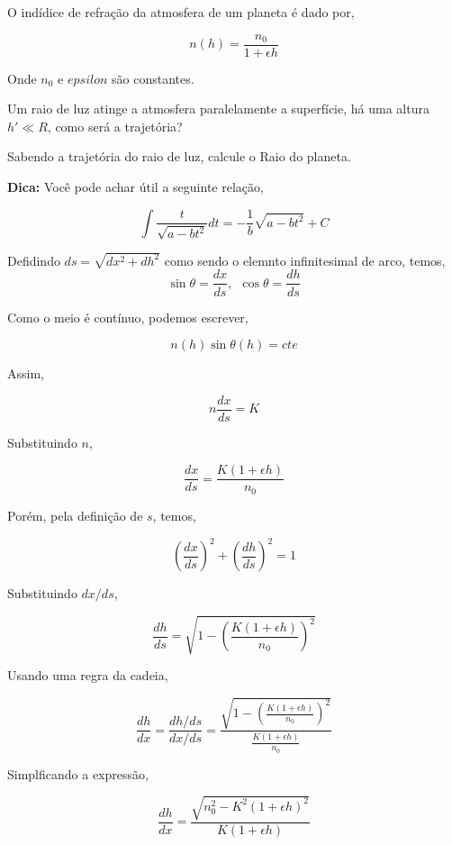 \documentclass[11pt]{article}
\begin{document}
\begin{pproblem}
    O indídice de refração da atmosfera de um planeta é dado por, 

    \[n(h) = \frac{n_0}{1+\epsilon h}\]

    Onde \(n_0\) e \(epsilon\) são constantes.

    \begin{alternativas}
        \item Um raio de luz atinge a atmosfera paralelamente a superfície, há uma altura \(h'\ll R\), como será a trajetória?
        \item Sabendo a trajetória do raio de luz, calcule o Raio do planeta.
    
        \textbf{Dica:} Você pode achar útil a seguinte relação, 

        \[\int \frac{t}{\sqrt{a-bt^2}}dt = -\frac{1}{b}\sqrt{a-bt^2}+C\]
    \end{alternativas}
\begin{pssolution*}{}{}
    \begin{alternativas}
        \item Defidindo \(ds = \sqrt{dx^2+dh^2}\) como sendo o elemnto infinitesimal de arco, temos, 
        \[\sin\theta = \frac{dx}{ds}, \ \ \cos\theta = \frac{dh}{ds}\]

        Como o meio é contínuo, podemos escrever, 

        \[n(h)\sin\theta(h)=cte\]

        Assim, 

        \[n\frac{dx}{ds} = K\]

        Substituindo \(n\), 

        \[\frac{dx}{ds} = \frac{K(1+\epsilon h)}{n_0}\]

        Porém, pela definição de \(s\), temos, 

        \[\left(\frac{dx}{ds}\right)^2 + \left(\frac{dh}{ds}\right)^2 = 1\]

        Substituindo \(dx/ds\), 

        \[\frac{dh}{ds} = \sqrt{1- \left(\frac{K(1+\epsilon h)}{n_0}\right)^2}\]

        Usando uma regra da cadeia, 

        \[\frac{dh}{dx} = \frac{dh/ds}{dx/ds} = \frac{\sqrt{1- \left(\frac{K(1+\epsilon h)}{n_0}\right)^2}}{\frac{K(1+\epsilon h)}{n_0}}\]

        Simplficando a expressão, 

        \[\frac{dh}{dx} = \frac{\sqrt{n_0^2 - K^2(1+\epsilon h)^2}}{K(1+\epsilon h)}\]


\end{alternativas}
\end{pssolution*}
\end{pproblem}
\end{document}
